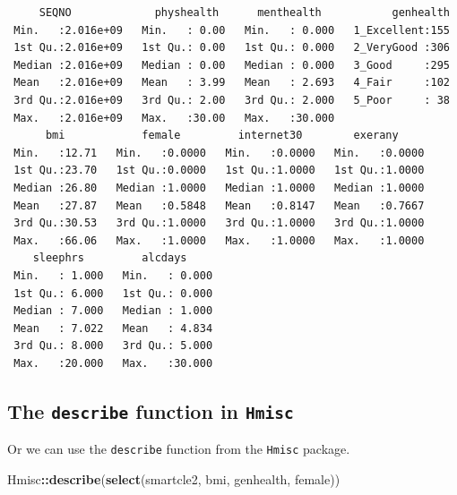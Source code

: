 \documentclass[]{book}
\newenvironment{Shaded}{\begin{snugshade}}{\end{snugshade}}
\newcommand{\KeywordTok}[1]{\textcolor[rgb]{0.13,0.29,0.53}{\textbf{#1}}}
\newcommand{\OperatorTok}[1]{\textcolor[rgb]{0.81,0.36,0.00}{\textbf{#1}}}
\newcommand{\NormalTok}[1]{#1}
\theoremstyle{definition}
\theoremstyle{definition}
\theoremstyle{definition}
\theoremstyle{remark}
\begin{document}
\begin{verbatim}
     SEQNO             physhealth      menthealth           genhealth  
 Min.   :2.016e+09   Min.   : 0.00   Min.   : 0.000   1_Excellent:155  
 1st Qu.:2.016e+09   1st Qu.: 0.00   1st Qu.: 0.000   2_VeryGood :306  
 Median :2.016e+09   Median : 0.00   Median : 0.000   3_Good     :295  
 Mean   :2.016e+09   Mean   : 3.99   Mean   : 2.693   4_Fair     :102  
 3rd Qu.:2.016e+09   3rd Qu.: 2.00   3rd Qu.: 2.000   5_Poor     : 38  
 Max.   :2.016e+09   Max.   :30.00   Max.   :30.000                    
      bmi            female         internet30        exerany      
 Min.   :12.71   Min.   :0.0000   Min.   :0.0000   Min.   :0.0000  
 1st Qu.:23.70   1st Qu.:0.0000   1st Qu.:1.0000   1st Qu.:1.0000  
 Median :26.80   Median :1.0000   Median :1.0000   Median :1.0000  
 Mean   :27.87   Mean   :0.5848   Mean   :0.8147   Mean   :0.7667  
 3rd Qu.:30.53   3rd Qu.:1.0000   3rd Qu.:1.0000   3rd Qu.:1.0000  
 Max.   :66.06   Max.   :1.0000   Max.   :1.0000   Max.   :1.0000  
    sleephrs         alcdays      
 Min.   : 1.000   Min.   : 0.000  
 1st Qu.: 6.000   1st Qu.: 0.000  
 Median : 7.000   Median : 1.000  
 Mean   : 7.022   Mean   : 4.834  
 3rd Qu.: 8.000   3rd Qu.: 5.000  
 Max.   :20.000   Max.   :30.000  
\end{verbatim}

\subsection{\texorpdfstring{The \texttt{describe} function in
\texttt{Hmisc}}{The describe function in Hmisc}}\label{the-describe-function-in-hmisc}

Or we can use the \texttt{describe} function from the \texttt{Hmisc}
package.

\begin{Shaded}
\begin{Highlighting}[]
\NormalTok{Hmisc}\OperatorTok{::}\KeywordTok{describe}\NormalTok{(}\KeywordTok{select}\NormalTok{(smartcle2, bmi, genhealth, female))}
\end{Highlighting}
\end{Shaded}
\end{document}
